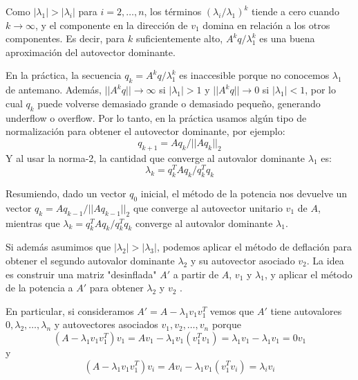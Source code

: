 \documentclass{article}
\begin{document}
Como $|\lambda_1| > |\lambda_i|$ para $i = 2, \ldots, n$, los términos $({\lambda_i}/{\lambda_1})^k$ tiende a cero cuando $k \to \infty$, y el componente en la dirección de $v_1$ domina en relación a los otros componentes. Es decir, para $k$ suficientemente alto, $A^k q / \lambda_1^{k}$ es una buena aproximación del autovector dominante. 

En la práctica, la secuencia $q_k = A^k q / \lambda_1^{k}$ es inaccesible porque no conocemos $\lambda_1$ de antemano. Además, $||A^k q|| \to \infty$ si $|\lambda_1| > 1$ y $||A^k q|| \to 0$ si $|\lambda_1| < 1$, por lo cual $q_k$ puede volverse demasiado grande o demasiado pequeño, generando underflow o overflow. Por lo tanto, en la práctica usamos algún tipo de normalización para obtener el autovector dominante, por ejemplo: 
%
\begin{equation} \label{eq:potencia_autovector}
    q_{k+1} = A q_{k} / ||A q_{k}||_{2}
\end{equation}
%
Y al usar la norma-2, la cantidad que converge al autovalor dominante $\lambda_1$ es:
%
\begin{equation} \label{eq:potencia_autovalor}
    \lambda_k = q_k^T A q_k / q_k^T q_k
\end{equation}


Resumiendo, dado un vector $q_0$ inicial, el método de la potencia nos devuelve un vector $q_k = A q_{k-1} / ||A q_{k-1}||_{2}$ que converge al autovector unitario $v_1$ de $A$, mientras que $\lambda_k = q_k^T A q_k / q_k^T q_k$ converge al autovalor dominante $\lambda_1$. 


Si además asumimos que $|\lambda_2| > |\lambda_3|$, podemos aplicar el método de deflación para obtener el segundo autovalor dominante $\lambda_2$ y su autovector asociado $v_2$. La idea es construir una matriz "desinflada" $A'$ a partir de $A$, $v_1$ y $\lambda_1$, y aplicar el método de la potencia a $A'$ para obtener $\lambda_2$ y $v_2$ \citep{watkins2004fundamentals}.

En particular, si consideramos $A' = A - \lambda_1 v_1 v_1^T$ vemos que $A'$ tiene autovalores $0, \lambda_2, \ldots, \lambda_n$ y autovectores asociados $v_1, v_2, \ldots, v_n$ porque 
%
$$
(A - \lambda_1 v_1 v_1^T) v_1 = A v_1 - \lambda_1 v_1 (v_1^T v_1) = \lambda_1 v_1 - \lambda_1 v_1 = 0 v_1
$$
y
$$
(A - \lambda_1 v_1 v_1^T) v_i = A v_i - \lambda_1 v_1 (v_1^T v_i) = \lambda_i v_i 
$$
\end{document}

